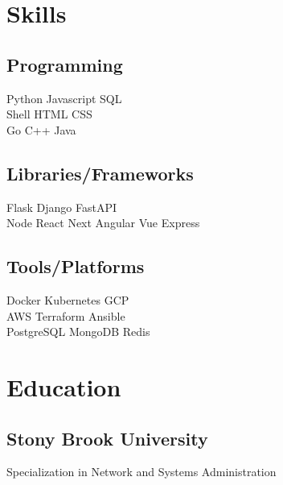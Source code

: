 \documentclass[]{plushcv}
\begin{document}
\begin{minipage}[t]{0.25\textwidth} 


\section{Skills}
\subsection{Programming}
\sectionsep
{}
Python \textbullet{} Javascript \textbullet{} SQL \textbullet{} \\
Shell \textbullet{} HTML \textbullet{} CSS  \\
\sectionsep
{}
Go \textbullet{} C++ \textbullet{} Java \\
\sectionsep
\sectionsep
\subsection{Libraries/Frameworks}
\sectionsep
Flask \textbullet{} Django \textbullet{} FastAPI \textbullet{}  \\
Node \textbullet{} React \textbullet{} Next \textbullet{} Angular \textbullet{} Vue \textbullet{} Express \\
\sectionsep
\sectionsep
\subsection{Tools/Platforms}
\sectionsep
Docker \textbullet{} Kubernetes \textbullet{} GCP \textbullet{} \\
AWS \textbullet{} Terraform \textbullet{} Ansible \textbullet{} \\
PostgreSQL \textbullet{} MongoDB \textbullet{} Redis \\

\sectionsep


\section{Education} 
\subsection{Stony Brook University}
Specialization in Network and Systems Administration \\


\end{minipage}
\end{document}
